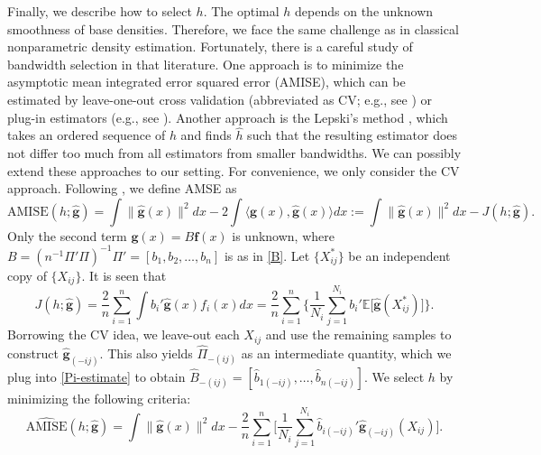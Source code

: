 \documentclass[preprint,11pt]{article}
\numberwithin{equation}{section}
\newcommand{\beq}{\begin{equation}}
\newcommand{\eeq}{\end{equation}}
\begin{document}
Finally, we describe how to select $h$. The optimal $h$ depends on the unknown smoothness of base densities. Therefore, we face the same challenge as in classical nonparametric density estimation. 
Fortunately, there is a careful study of bandwidth selection in that literature. One approach is to minimize the asymptotic mean integrated error squared error (AMISE), which can be estimated by leave-one-out cross validation (abbreviated as CV; e.g., see \cite{park1993cross}) or plug-in estimators (e.g., see \cite{hall1991optimal}). 
Another approach is the Lepski's method \citep{lepskii1992asymptotically}, which takes an ordered sequence of $h$ and finds $\hat{h}$ such that the resulting estimator does not differ too much from all estimators from smaller bandwidths. We can possibly extend these approaches to our setting. For convenience, we only consider the CV approach. Following \citet[Page 135-137]{wasserman2006all}, we define AMSE as 
\[
\text{AMISE}(h; \widehat{\bm{g}}) = \int \|\widehat{\bm{g}}(x)\|^2dx - 2\int \bigl\langle\bm{g}(x), \widehat{\bm{g}}(x)\bigr\rangle dx:= \int \|\widehat{\bm{g}}(x)\|^2dx - J(h; \widehat{\bm{g}}). 
\]
Only the second term  $\bm{g}(x)=B\bm{f}(x)$ is unknown, where $B =(n^{-1}\Pi'\Pi)^{-1}\Pi'=[b_1,b_2, \ldots,b_n]$ is as in \eqref{B}. Let $\{X^*_{ij}\}$ be an independent copy of $\{X_{ij}\}$. It is seen that 
\[
J(h; \widehat{\bm{g}}) = \frac{2}{n}\sum_{i=1}^n  \int  b_i' \widehat{\bm{g}}(x) f_i(x)dx = \frac{2}{n}\sum_{i=1}^n  \Biggl\{
\frac{1}{N_i}\sum_{j=1}^{N_i}
b_i'\mathbb{E}\bigl[\widehat{\bm{g}}(X^*_{ij})\bigr]\Biggr\}. 
\]
Borrowing the CV idea, we leave-out each $X_{ij}$ and use the remaining samples to construct $\widehat{\bm{g}}_{(-ij)}$. This also yields $\widehat{\Pi}_{-(ij)}$ as an intermediate quantity, which we plug into \eqref{Pi-estimate} to obtain $\widehat{B}_{-(ij)}=[\hat{b}_{1(-ij)}, \ldots, \hat{b}_{n(-ij)}]$.  
We select $h$ by minimizing the following criteria: 
\beq \label{CV}
\widehat{\text{AMISE}}(h; \widehat{\bm{g}})
=
\int \|\widehat{\bm{g}}(x)\|^2 dx - \frac{2}{n} \sum_{i=1}^n 
\Biggl[ \frac{1}{N_i} \sum_{j=1}^{N_i} \hat{b}_{i (-ij)}'\widehat{\bm{g}}_{(-ij)}(X_{ij})\Biggr]. 
\eeq
\end{document}
